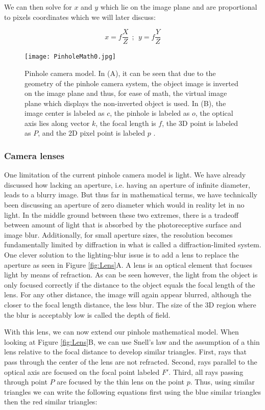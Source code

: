 We can then solve for $x$ and $y$ which lie on the image plane and are proportional to pixels coordinates which we will later discuss:

$$x=f\frac{X}{Z} \ \ ; \ \ y=f\frac{Y}{Z}$$

\begin{figure}
\centering
\texttt{[image: PinholeMath0.jpg]}
\caption{Pinhole camera model. In (A), it can be seen that due to the geometry of the pinhole camera system, the object image is inverted on the image plane and thus, for ease of math, the virtual image plane which displays the non-inverted object is used. In (B), the image center is labeled as $c$, the pinhole is labeled as $o$, the optical axis lies along vector $k$, the focal length is $f$, the 3D point is labeled as $P$, and the 2D pixel point is labeled $p$  \cite{HZ}.}
\label{fig:PinholeMath}
\end{figure}

\subsubsection{Camera lenses}

One limitation of the current pinhole camera model is light. We have already discussed how lacking an aperture, i.e. having an aperture of infinite diameter, leads to a blurry image. But thus far in mathematical terms, we have technically been discussing an aperture of zero diameter which would in reality let in no light. In the middle ground between these two extremes, there is a tradeoff between amount of light that is absorbed by the photoreceptive surface and image blur. Additionally, for small aperture sizes, the resolution becomes fundamentally limited by diffraction in what is called a diffraction-limited system. One clever solution to the lighting-blur issue is to add a lens to replace the aperture as seen in Figure \ref{fig:Lens}A. A lens is an optical element that focuses light by means of refraction. As can be seen however, the light from the object is only focused correctly if the distance to the object equals the focal length of the lens. For any other distance, the image will again appear blurred, although the closer to the focal length distance, the less blur. The size of the 3D region where the blur is acceptably low is called the depth of field.

With this lens, we can now extend our pinhole mathematical model. When looking at Figure \ref{fig:Lens}B, we can use Snell's law and the assumption of a thin lens relative to the focal distance to develop similar triangles. First, rays that pass through the center of the lens are not refracted. Second, rays parallel to the optical axis are focused on the focal point labeled $F'$. Third, all rays passing through point $P$ are focused by the thin lens on the point $p$. Thus, using similar triangles we can write the following equations first using the blue similar triangles then the red similar triangles:

